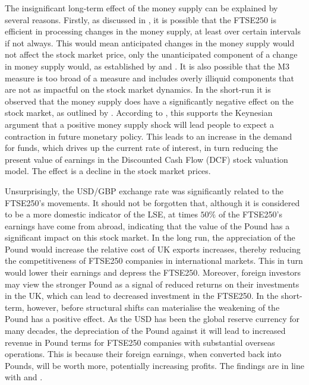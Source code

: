 \documentclass[11pt,a4paper]{article}
\newcommand{\citeboth}[1]{\citeauthor{#1} \citep{#1}}
\begin{document}
The insignificant long-term effect of the money supply can be explained by several reasons.
Firstly, as discussed in \citeboth{sellin2001}, it is possible that the FTSE250 is efficient in processing changes in the 
money supply, at least over certain intervals if not always. This would mean anticipated changes in the money supply would not affect the stock market price, only the
unanticipated component of a change in money supply would, as established by \citeboth{sorensen1982} and \citeboth{bernanke2005}. 
It is also possible that the M3 measure is too broad of a measure and includes overly illiquid components that are not as impactful 
on the stock market dynamics. In the short-run it is observed that the money supply does have a 
significantly negative effect on the stock market, as outlined by \citeboth{olawale2014}. According to \citeboth{sellin2001}, 
this supports the Keynesian argument that a positive money supply shock will lead people to
expect a contraction in future monetary policy. 
This leads to an increase in the demand for funds, which drives up the current rate of interest, in turn
reducing the present value of earnings in the Discounted Cash Flow (DCF) stock valuation model. The effect is a decline in the stock market prices.

Unsurprisingly, the USD/GBP exchange rate was significantly related to the FTSE250's movements. It 
should not be forgotten that, although it is considered to be a more domestic indicator of the LSE, 
at times $50\%$ of the FTSE250's earnings have come from abroad, indicating that 
the value of the Pound has a significant impact on this stock market. 
In the long run, the appreciation of the Pound would increase the relative 
cost of UK exports increases, thereby reducing the 
competitiveness of FTSE250 companies in international markets. This in turn would lower their earnings
and depress the FTSE250. Moreover, foreign investors may view the stronger Pound as a signal of reduced returns on their investments in the UK, which can lead to decreased investment in the FTSE250. 
In the short-term, however, before structural shifts can materialise the
weakening of the Pound has a positive effect. As the USD has been 
the global reserve currency for many decades, the depreciation of the Pound 
against it will lead to increased revenue in Pound terms for FTSE250 companies with substantial overseas operations. This is because their foreign earnings, when converted back into Pounds, will be worth more, potentially increasing profits. The findings 
are in line with \citeboth{neifar2023} and \citeboth{khan2018}.
\end{document}
